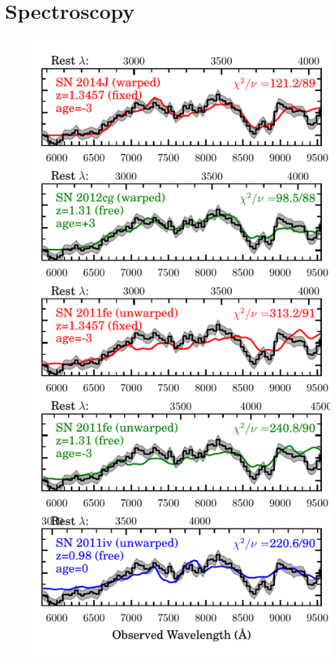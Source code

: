 \section{Spectroscopy}
\label{sec:Spectroscopy}

\begin{figure}
\begin{center}
\includegraphics[width=\columnwidth]{specfit}

\end{center}
\end{figure}
